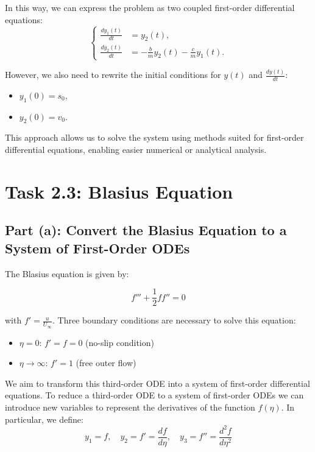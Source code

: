 \documentclass{article}
\begin{document}
In this way, we can express the problem as two coupled first-order differential equations:
\[
\begin{cases}
\frac{dy_1(t)}{dt} &= y_2(t), \\
\frac{dy_2(t)}{dt} &= -\frac{b}{m} y_2(t) - \frac{c}{m} y_1(t).
\end{cases}
\]

However, we also need to rewrite the initial conditions for \( y(t) \) and \( \frac{dy(t)}{dt} \):
\begin{itemize}
    \item \( y_1(0) = s_0 \),
    \item \( y_2(0) = v_0 \).
\end{itemize}

This approach allows us to solve the system using methods suited for first-order differential equations, enabling easier numerical or analytical analysis.










\section*{Task 2.3: Blasius Equation}

\subsection*{Part (a): Convert the Blasius Equation to a System of First-Order ODEs}

The Blasius equation is given by:

\begin{equation}
f''' + \frac{1}{2} f f'' = 0
\end{equation}

with \( f' = \frac{u}{U_\infty} \). Three boundary conditions are necessary to solve this equation:
\begin{itemize}
    \item \( \eta = 0 \): \( f' = f = 0 \) (no-slip condition)
    \item \( \eta \to \infty \): \( f' = 1 \) (free outer flow)
\end{itemize}

We aim to transform this third-order ODE into a system of first-order differential equations. To reduce a third-order ODE to a 
system of first-order ODEs we can introduce new variables to represent the derivatives of the function \( f(\eta) \). 
In particular, we define:
\[
y_1 = f, \quad y_2 = f' = \frac{df}{d\eta}, \quad y_3 = f'' = \frac{d^2 f}{d\eta^2}
\]
\end{document}
